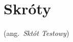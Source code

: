 \chapter*{Skróty}\mbox{}
\label{sec:skroty}
\noindent
\begin{description}[labelwidth=*]
  \item [ST] (ang.\ \emph{Sktót Testowy}) %
\end{description}
